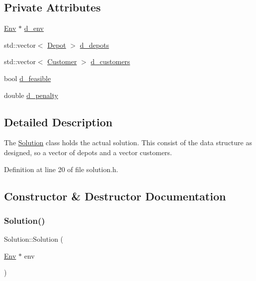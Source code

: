 \subsection*{Private Attributes}
\begin{DoxyCompactItemize}
\item 
\hyperlink{class_env}{Env} $\ast$ \hyperlink{class_solution_a9d210c71836c3d0195c14322d1a59ed8}{d\+\_\+env}
\item 
std\+::vector$<$ \hyperlink{class_depot}{Depot} $>$ \hyperlink{class_solution_a78d6e40ffd00ad0ab0d811ba1cdff377}{d\+\_\+depots}
\item 
std\+::vector$<$ \hyperlink{class_customer}{Customer} $>$ \hyperlink{class_solution_aa639f6f348d3e2014491d62eeccd1d2a}{d\+\_\+customers}
\item 
bool \hyperlink{class_solution_a195ca2bc3ad2abee9346ddb40bd324c1}{d\+\_\+feasible}
\item 
double \hyperlink{class_solution_a553459be3bb9cb467c4482eb9c260815}{d\+\_\+penalty}
\end{DoxyCompactItemize}


\subsection{Detailed Description}
The \hyperlink{class_solution}{Solution} class holds the actual solution. This consist of the data structure as designed, so a vector of depots and a vector customers. 

Definition at line 20 of file solution.\+h.



\subsection{Constructor \& Destructor Documentation}
\mbox{\label{class_solution_a3bdbdf455adecf7ab0f71bbce1efad66}} 
\subsubsection{\texorpdfstring{Solution()}{Solution()}}
{\footnotesize\ttfamily Solution\+::\+Solution (\begin{DoxyParamCaption}\item[{\hyperlink{class_env}{Env} $\ast$}]{env }\end{DoxyParamCaption})}



